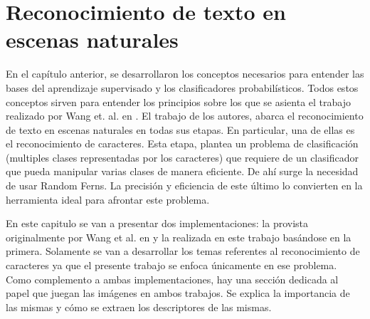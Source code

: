 \newpage	
\section{Reconocimiento de texto en escenas naturales}

	En el capítulo anterior, se desarrollaron los conceptos necesarios para entender las bases del aprendizaje supervisado y los clasificadores probabilísticos. Todos estos conceptos sirven para entender los principios sobre los que se asienta el trabajo realizado por Wang et. al. en \cite{wang}. El trabajo de los autores, abarca el reconocimiento de texto en escenas naturales en todas sus etapas. En particular, una de ellas es el reconocimiento de caracteres. Esta etapa, plantea un problema de clasificación (multiples clases representadas por los caracteres) que requiere de un clasificador que pueda manipular varias clases de manera eficiente. De ahí surge la necesidad de usar Random Ferns. La precisión y eficiencia de este último lo convierten en la herramienta ideal para afrontar este problema.
	
	En este capitulo se van a presentar dos implementaciones: la provista originalmente por Wang et al. en \cite{wang} y la realizada en este trabajo basándose en la primera. Solamente se van a desarrollar los temas referentes al reconocimiento de caracteres ya que el presente trabajo se enfoca únicamente en ese problema. Como complemento a ambas implementaciones, hay una sección dedicada al papel que juegan las imágenes en ambos trabajos. Se explica la importancia de las mismas y cómo se extraen los descriptores de las mismas.
	
	
		
	
	
	
	
	
